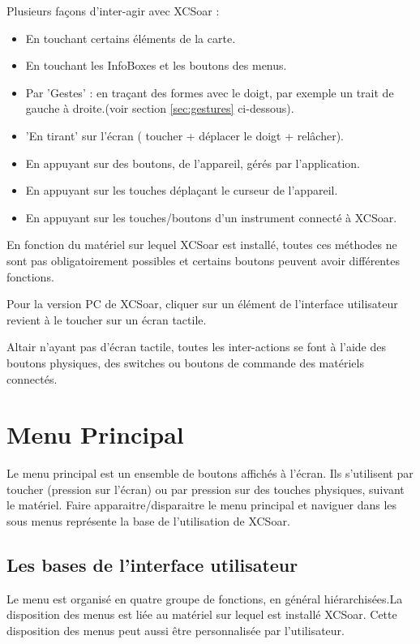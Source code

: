 Plusieurs façons d'inter-agir avec XCSoar :
\begin{itemize}
\item En touchant certains éléments de la carte.
\item En touchant les InfoBoxes et les boutons des menus.
\item Par 'Gestes' : en traçant des formes avec le doigt, par exemple un trait de gauche à droite.(voir section  \ref{sec:gestures} ci-dessous).
\item 'En tirant' sur l'écran ( toucher + déplacer le doigt + relâcher).
\item En appuyant sur des boutons, de l'appareil, gérés par l'application.
\item En appuyant sur les touches déplaçant le curseur de l'appareil.
\item En appuyant sur les touches/boutons d'un instrument connecté à XCSoar.
\end{itemize}
En fonction du matériel sur lequel XCSoar est installé, toutes ces méthodes ne sont pas obligatoirement possibles et certains boutons peuvent avoir différentes fonctions.

Pour la version PC de XCSoar, cliquer sur un élément de l'interface utilisateur revient à le toucher sur un écran tactile.

Altair n'ayant pas d'écran tactile, toutes les inter-actions se font à l'aide des boutons physiques, des switches ou boutons de commande des matériels connectés.

\section{Menu Principal}

Le menu principal est un ensemble de boutons affichés à l'écran. Ils s'utilisent par toucher (pression sur l'écran) ou par pression sur des touches physiques, suivant le matériel. Faire apparaitre/disparaitre le menu principal et naviguer dans les sous menus représente la base de l'utilisation de XCSoar.

\subsection*{Les bases de l'interface utilisateur}
Le menu est organisé en quatre groupe de fonctions, en général hiérarchisées.La disposition des menus est liée au matériel sur lequel est installé XCSoar. Cette disposition des menus peut aussi être personnalisée par l'utilisateur.

